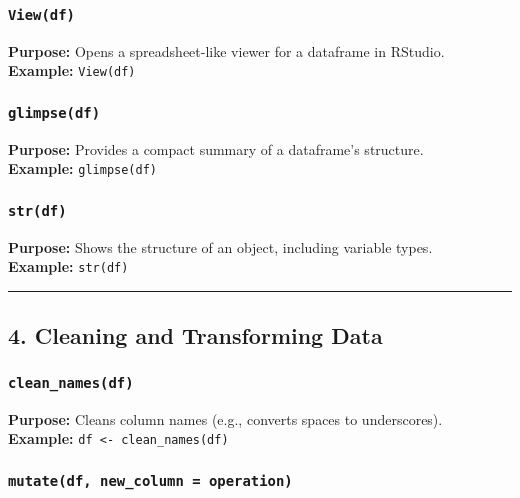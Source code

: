 \documentclass[
  11pt,
]{article}
\begin{document}
\subsubsection{\texorpdfstring{\textbf{\texttt{View(df)}}}{View(df)}}\label{viewdf}

\textbf{Purpose:} Opens a spreadsheet-like viewer for a dataframe in
RStudio.\\
\textbf{Example:} \texttt{View(df)}

\subsubsection{\texorpdfstring{\textbf{\texttt{glimpse(df)}}}{glimpse(df)}}\label{glimpsedf}

\textbf{Purpose:} Provides a compact summary of a dataframe's
structure.\\
\textbf{Example:} \texttt{glimpse(df)}

\subsubsection{\texorpdfstring{\textbf{\texttt{str(df)}}}{str(df)}}\label{strdf}

\textbf{Purpose:} Shows the structure of an object, including variable
types.\\
\textbf{Example:} \texttt{str(df)}

\begin{center}\rule{0.5\linewidth}{0.5pt}\end{center}

\subsection{\texorpdfstring{\textbf{4. Cleaning and Transforming
Data}}{4. Cleaning and Transforming Data}}\label{cleaning-and-transforming-data}

\subsubsection{\texorpdfstring{\textbf{\texttt{clean\_names(df)}}}{clean\_names(df)}}\label{clean_namesdf}

\textbf{Purpose:} Cleans column names (e.g., converts spaces to
underscores).\\
\textbf{Example:} \texttt{df\ \textless{}-\ clean\_names(df)}

\subsubsection{\texorpdfstring{\textbf{\texttt{mutate(df,\ new\_column\ =\ operation)}}}{mutate(df, new\_column = operation)}}\label{mutatedf-new_column-operation}
\end{document}
